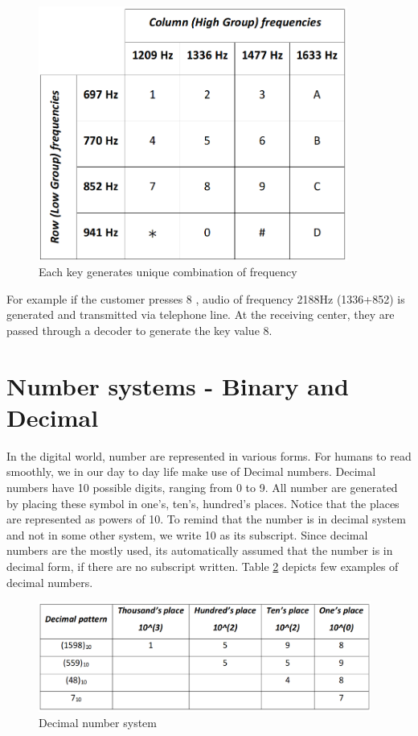 \begin{figure}
    \centering
    \includegraphics[width=4in]{Tables/DTMF/keypad_frequency.png}
    \caption[Keypad frequency]{ Each key generates unique combination of frequency}
    \label{fig:keypad}
\end{figure}

\par For example if the customer presses 8 , audio of frequency 2188Hz (1336+852) is generated and transmitted via telephone line. At the receiving center, they are passed through a decoder to generate the key value 8.


\section{Number systems - Binary and Decimal}

\par In the digital world, number are represented in various forms. For humans to read smoothly, we in our day to day life make use of Decimal numbers. Decimal numbers have 10 possible digits, ranging from 0 to 9. All number are generated by placing these symbol in one’s, ten’s, hundred’s places. Notice that the places are represented as powers of 10. To remind that the number is in decimal system and not in some other system, we write 10 as its subscript. Since decimal numbers are the mostly used, its automatically assumed that the number is in decimal form, if there are no subscript written. Table \ref{fig:decimal} depicts few examples of decimal numbers.

\begin{figure}
    \centering
    \includegraphics[width=4.3in]{Tables/DTMF/decimal_system.png}
    \caption[Decimal Number system]{Decimal number system}
    \label{fig:decimal}
\end{figure}

